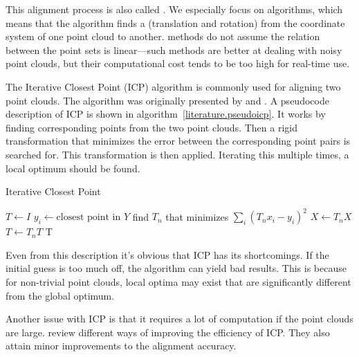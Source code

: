 This alignment process is also called . We especially focus on  algorithms, which means that the algorithm finds a  (translation and rotation) from the coordinate system of one point cloud to another.  methods do not assume the relation between the point sets is linear---such methods are better at dealing with noisy point clouds, but their computational cost tends to be too high for real-time use.

\newtopic

The Iterative Closest Point (ICP) algorithm is commonly used for aligning two point clouds. The algorithm was originally presented by \citet{besl1992method} and \citet{chen1991object}. A pseudocode description of ICP is shown in algorithm~\ref{literature.pseudoicp}. It works by finding corresponding points from the two point clouds. Then a rigid transformation that minimizes the error between the corresponding point pairs is searched for. This transformation is then applied. Iterating this multiple times, a local optimum should be found.

\begin{algorithm}
\caption{Iterative Closest Point}
\label{literature.pseudoicp}
\begin{algorithmic}
     
        \State $T \gets I$ 
                \State $y_i \gets \text{closest point in } Y$
            \EndFor
            \State find $T_n$ that minimizes $\sum_i (T_n x_i-y_i)^2$
            \State $X \gets T_n X$ 
            \State $T \gets T_n T$
        \EndFor
        \State \Return T
    \EndProcedure
\end{algorithmic}
\end{algorithm}

Even from this description it's obvious that ICP has its shortcomings. If the initial guess is too much off, the algorithm can yield bad results. This is because for non-trivial point clouds, local optima may exist that are significantly different from the global optimum.

Another issue with ICP is that it requires a lot of computation if the point clouds are large. \citet{rusinkiewicz2001efficient} review different ways of improving the efficiency of ICP. They also attain minor improvements to the alignment accuracy.

